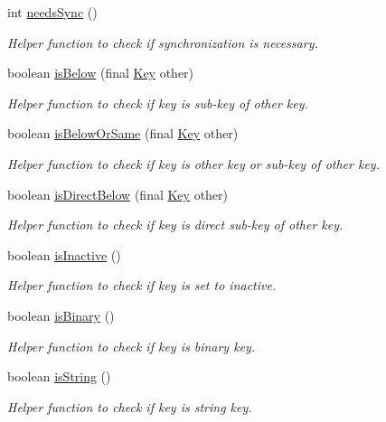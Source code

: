 \begin{DoxyCompactItemize}
int \hyperlink{classorg_1_1libelektra_1_1Key_a6f5afab907a28b264af0981e9db58c64}{needs\+Sync} ()
\begin{DoxyCompactList}\small\item\em Helper function to check if synchronization is necessary. \end{DoxyCompactList}\item 
boolean \hyperlink{classorg_1_1libelektra_1_1Key_af9a7a7941c07c058f1d4bd6c55e20fe9}{is\+Below} (final \hyperlink{classorg_1_1libelektra_1_1Key}{Key} other)
\begin{DoxyCompactList}\small\item\em Helper function to check if key is sub-\/key of other key. \end{DoxyCompactList}\item 
boolean \hyperlink{classorg_1_1libelektra_1_1Key_ab3143b14824a384ec4b6f9005f6da554}{is\+Below\+Or\+Same} (final \hyperlink{classorg_1_1libelektra_1_1Key}{Key} other)
\begin{DoxyCompactList}\small\item\em Helper function to check if key is other key or sub-\/key of other key. \end{DoxyCompactList}\item 
boolean \hyperlink{classorg_1_1libelektra_1_1Key_a799b0577d5e1491702e45566c943bda4}{is\+Direct\+Below} (final \hyperlink{classorg_1_1libelektra_1_1Key}{Key} other)
\begin{DoxyCompactList}\small\item\em Helper function to check if key is direct sub-\/key of other key. \end{DoxyCompactList}\item 
boolean \hyperlink{classorg_1_1libelektra_1_1Key_a1707144b9d6c0c29531e3e372e1ffaee}{is\+Inactive} ()
\begin{DoxyCompactList}\small\item\em Helper function to check if key is set to inactive. \end{DoxyCompactList}\item 
boolean \hyperlink{classorg_1_1libelektra_1_1Key_a2323fd06287eac6343ed60756f3cc9c1}{is\+Binary} ()
\begin{DoxyCompactList}\small\item\em Helper function to check if key is binary key. \end{DoxyCompactList}\item 
boolean \hyperlink{classorg_1_1libelektra_1_1Key_acb0e1141fa920b798a66a2076cd61562}{is\+String} ()
\begin{DoxyCompactList}\small\item\em Helper function to check if key is string key. \end{DoxyCompactList}\item 

\end{DoxyCompactItemize}
